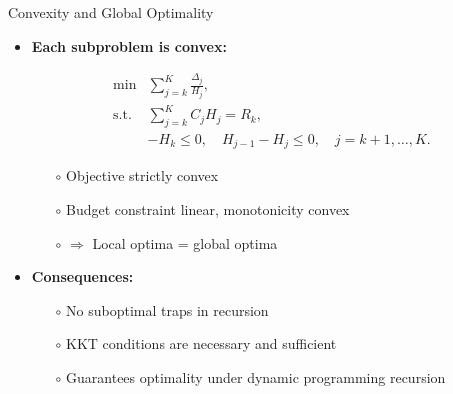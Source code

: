 \documentclass{beamer}
\begin{document}
\begin{frame}{Convexity and Global Optimality}
\begin{itemize}[leftmargin=5pt] 
\item \textcolor{myblue3}{\bf Each subproblem is convex:}
{\footnotesize
\[
\begin{array}{ll}
\displaystyle 
\min & 
\displaystyle 
\sum_{j=k}^K \frac{\Delta_j}{H_j}, \\[1em]
\text{s.t.} &
\displaystyle \sum_{j=k}^K C_j H_j = R_k,\\[0.3em]
& -H_k\le 0, \quad H_{j-1}-H_j\le 0, \quad j=k+1,\ldots,K.
\end{array}
\]

\begin{itemize}[leftmargin=15pt] 
\item[$\circ$] Objective strictly convex
    \item[$\circ$] Budget constraint linear, monotonicity convex
    \item[$\circ$] $\Rightarrow$ Local optima = global optima
\end{itemize}
}
\vspace{2mm}
\item \textcolor{myblue3}{\bf Consequences:}
{\footnotesize
\begin{itemize}[leftmargin=15pt] 
\item[$\circ$] No suboptimal traps in recursion
    \item[$\circ$] KKT conditions are necessary and sufficient
    \item[$\circ$] Guarantees optimality under dynamic programming recursion
\end{itemize}
}
\end{itemize}
\end{frame}
\end{document}
